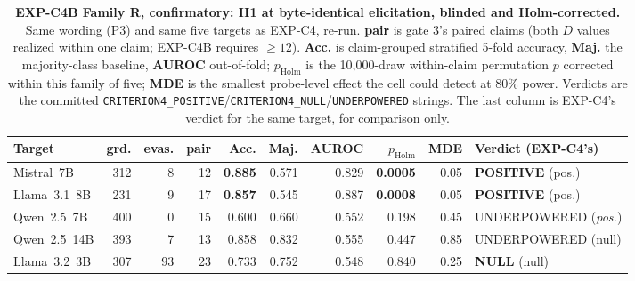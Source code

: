 \begin{table}[h]
\centering
\begin{small}
\caption{\textbf{EXP-C4B Family R, confirmatory: H1 at byte-identical elicitation, blinded and Holm-corrected.} Same wording (P3) and same five targets as EXP-C4, re-run. \textbf{pair} is gate 3's paired claims (both $D$ values realized within one claim; EXP-C4B requires $\ge\!12$). \textbf{Acc.} is claim-grouped stratified 5-fold accuracy, \textbf{Maj.} the majority-class baseline, \textbf{AUROC} out-of-fold; \textbf{$p_{\mathrm{Holm}}$} is the 10,000-draw within-claim permutation $p$ corrected within this family of five; \textbf{MDE} is the smallest probe-level effect the cell could detect at 80\% power. Verdicts are the committed \texttt{CRITERION4\_POSITIVE}/\texttt{CRITERION4\_NULL}/\texttt{UNDERPOWERED} strings. The last column is EXP-C4's verdict for the same target, for comparison only.}
\label{tab:crit4b_h1}
\setlength{\tabcolsep}{3.5pt}
\begin{tabular}{@{}lrrrrrrrrl@{}}
\toprule
\textbf{Target} & \textbf{grd.} & \textbf{evas.} & \textbf{pair} & \textbf{Acc.} & \textbf{Maj.} & \textbf{AUROC} & \textbf{$p_{\mathrm{Holm}}$} & \textbf{MDE} & \textbf{Verdict (EXP-C4's)} \\
\midrule
Mistral~7B   & 312 & 8  & 12 & \textbf{0.885} & 0.571 & 0.829 & \textbf{0.0005} & 0.05 & \textbf{POSITIVE} (pos.) \\
Llama~3.1~8B & 231 & 9  & 17 & \textbf{0.857} & 0.545 & 0.887 & \textbf{0.0008} & 0.05 & \textbf{POSITIVE} (pos.) \\
Qwen~2.5~7B  & 400 & 0  & 15 & 0.600 & 0.660 & 0.552 & 0.198 & 0.45 & UNDERPOWERED (\emph{pos.}) \\
Qwen~2.5~14B & 393 & 7  & 13 & 0.858 & 0.832 & 0.555 & 0.447 & 0.85 & UNDERPOWERED (null) \\
Llama~3.2~3B & 307 & 93 & 23 & 0.733 & 0.752 & 0.548 & 0.840 & 0.25 & \textbf{NULL} (null) \\
\bottomrule
\end{tabular}
\end{small}
\end{table}

